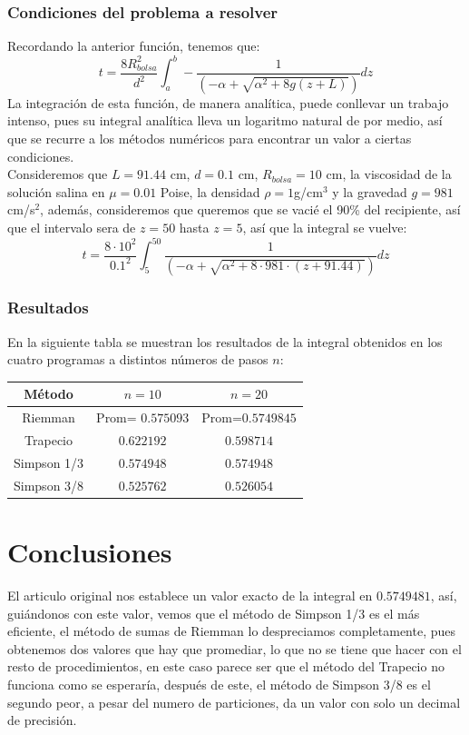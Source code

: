 \documentclass[10pt]{article}
\begin{document}
\begin{multicols}{2}
		\subsubsection{Condiciones del problema a resolver}
		Recordando la anterior función, tenemos que:
		$$t=\frac{8R_{bolsa}^2}{d^2}\int_a^b-\frac{1}{(-\alpha+\sqrt{\alpha^2+8g(z+L)})}dz$$
		La integración de esta función, de manera analítica, puede conllevar un trabajo intenso, pues su integral analítica lleva un logaritmo natural de por medio, así que se recurre a los métodos numéricos para encontrar un valor a ciertas condiciones.\\
		Consideremos que $L=91.44$ cm, $d=0.1$ cm, $R_{bolsa}=10$ cm, la viscosidad de la solución salina en $\mu=0.01$ Poise, la densidad $\rho=1$g/cm$^3$ y la gravedad $g=981$ cm/s$^2$, además, consideremos que queremos que se vacié el 90\%  del recipiente, así que el intervalo sera de $z=50$ hasta $z=5$, así que la integral se vuelve:
		$$t=\frac{8\cdot 10^2}{0.1^2}\int_{5}^{50}\frac{1}{(-\alpha+\sqrt{\alpha^2+8\cdot981 \cdot(z+91.44)})}dz$$
		\subsubsection{Resultados}
		En la siguiente tabla se muestran los resultados de la integral obtenidos en los cuatro programas a distintos números de pasos $n$:
		\begin{center}
		\begin{tabular}{| c | c | c |}
			\hline
			Método & $n=10$ & $n=20$ \\ \hline
			Riemman & Prom= $0.575093$ & Prom=$0.5749845$ \\
			Trapecio & $0.622192$ & $0.598714$\\
			Simpson 1/3 & $0.574948$ & $0.574948$ \\ 
			Simpson 3/8 & $0.525762$ & $0.526054$ \\ \hline
		\end{tabular}
		\end{center}
		\section{Conclusiones}
		El articulo original nos establece un valor exacto de la integral en $0.5749481$, así, guiándonos con este valor, vemos que el método de Simpson 1/3 es el más eficiente, el método de sumas de Riemman lo despreciamos completamente, pues obtenemos dos valores que hay que promediar, lo que no se tiene que hacer con el resto de procedimientos, en este caso parece ser que el método del Trapecio no funciona como se esperaría, después de este, el método de Simpson 3/8 es el segundo peor, a pesar del numero de particiones, da un valor con solo un decimal de precisión.
	\end{multicols}
	\appendix 
\end{document}
